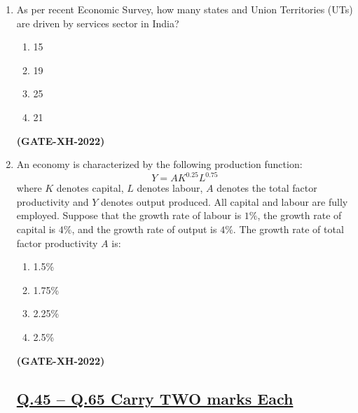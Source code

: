 \documentclass[journal]{IEEEtran}
\begin{document}
\begin{enumerate}
\item As per recent Economic Survey, how many states and Union Territories (UTs) are driven by services sector in India?
\begin{multicols}{2}
\begin{enumerate}
\item 15
\item 19
\item 25
\item 21
\end{enumerate}
\end{multicols}
\hfill\textbf{(GATE-XH-2022)}

\item An economy is characterized by the following production function:
\[
Y = A K^{0.25} L^{0.75}
\]
where $K$ denotes capital, $L$ denotes labour, $A$ denotes the total factor productivity and $Y$ denotes output produced. All capital and labour are fully employed. Suppose that the growth rate of labour is $1\%$, the growth rate of capital is $4\%$, and the growth rate of output is $4\%$. The growth rate of total factor productivity $A$ is:
\begin{multicols}{4}
\begin{enumerate}
\item 1.5\%
\item 1.75\%
\item 2.25\%
\item 2.5\%
\end{enumerate}
\end{multicols}
\hfill\textbf{(GATE-XH-2022)}
\subsection*{\underline{\textbf{Q.45 – Q.65 Carry TWO marks Each}}}


\end{enumerate}
\end{document}
